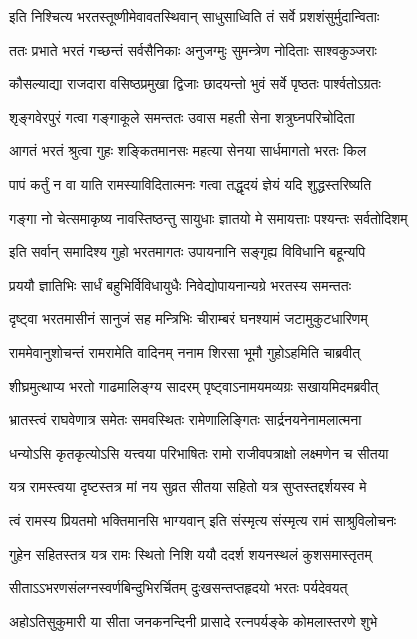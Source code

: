 \twolineshloka
{इति निश्चित्य भरतस्तूष्णीमेवावतस्थिवान्}
{साधुसाध्विति तं सर्वे प्रशशंसुर्मुदान्विताः} %

\twolineshloka
{ततः प्रभाते भरतं गच्छन्तं सर्वसैनिकाः}
{अनुजग्मुः सुमन्त्रेण नोदिताः साश्वकुञ्जराः} %

\twolineshloka
{कौसल्याद्या राजदारा वसिष्ठप्रमुखा द्विजाः}
{छादयन्तो भुवं सर्वे पृष्ठतः पार्श्वतोऽग्रतः} %

\twolineshloka
{शृङ्गवेरपुरं गत्वा गङ्गाकूले समन्ततः}
{उवास महती सेना शत्रुघ्नपरिचोदिता} %

\twolineshloka
{आगतं भरतं श्रुत्वा गुहः शङ्कितमानसः}
{महत्या सेनया सार्धमागतो भरतः किल} %

\twolineshloka
{पापं कर्तुं न वा याति रामस्याविदितात्मनः}
{गत्वा तद्धृदयं ज्ञेयं यदि शुद्धस्तरिष्यति} %

\twolineshloka
{गङ्गा नो चेत्समाकृष्य नावस्तिष्ठन्तु सायुधाः}
{ज्ञातयो मे समायत्ताः पश्यन्तः सर्वतोदिशम्} %

\twolineshloka
{इति सर्वान् समादिश्य गुहो भरतमागतः}
{उपायनानि सङ्गृह्य विविधानि बहून्यपि} %

\twolineshloka
{प्रययौ ज्ञातिभिः सार्धं बहुभिर्विविधायुधैः}
{निवेद्योपायनान्यग्रे भरतस्य समन्ततः} %

\twolineshloka
{दृष्ट्वा भरतमासीनं सानुजं सह मन्त्रिभिः}
{चीराम्बरं घनश्यामं जटामुकुटधारिणम्} %

\twolineshloka
{राममेवानुशोचन्तं रामरामेति वादिनम्}
{ननाम शिरसा भूमौ गुहोऽहमिति चाब्रवीत्} %

\twolineshloka
{शीघ्रमुत्थाप्य भरतो गाढमालिङ्ग्य सादरम्}
{पृष्ट्वाऽनामयमव्यग्रः सखायमिदमब्रवीत्} %

\twolineshloka
{भ्रातस्त्वं राघवेणात्र समेतः समवस्थितः}
{रामेणालिङ्गितः सार्द्रनयनेनामलात्मना} %

\twolineshloka
{धन्योऽसि कृतकृत्योऽसि यत्त्वया परिभाषितः}
{रामो राजीवपत्राक्षो लक्ष्मणेन च सीतया} %

\twolineshloka
{यत्र रामस्त्वया दृष्टस्तत्र मां नय सुव्रत}
{सीतया सहितो यत्र सुप्तस्तद्दर्शयस्व मे} %

\twolineshloka
{त्वं रामस्य प्रियतमो भक्तिमानसि भाग्यवान्}
{इति संस्मृत्य संस्मृत्य रामं साश्रुविलोचनः} %

\twolineshloka
{गुहेन सहितस्तत्र यत्र रामः स्थितो निशि}
{ययौ ददर्श शयनस्थलं कुशसमास्तृतम्} %

\twolineshloka
{सीताऽऽभरणसंलग्नस्वर्णबिन्दुभिरर्चितम्}
{दुःखसन्तप्तहृदयो भरतः पर्यदेवयत्} %

\twolineshloka
{अहोऽतिसुकुमारी या सीता जनकनन्दिनी}
{प्रासादे रत्नपर्यङ्के कोमलास्तरणे शुभे} %

